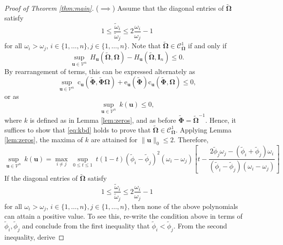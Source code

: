 \documentclass[12pt]{article}
\newcommand{\bl}[1]{{\mathbf #1}}
\newcommand{\bs}[1]{\boldsymbol #1}
\begin{document}
\begin{proof}[Proof of Theorem \ref{thm:main}]
($\implies$) Assume that the diagonal entries of $\tilde{\bs{\Omega}}$ satisfy
\begin{equation*}
    1 \leq \frac{\tilde{\omega}_i}{\tilde{\omega}_j} \leq 2\frac{\omega_i}{\omega_j} - 1
\end{equation*}
for all $\omega_i > \omega_j$, $i \in \{1, \dots, n\}, j \in \{1, \dots, n\}$. Note that $\tilde{\bs{\Omega}} \in \mathcal{C}^1_{\bs{\Omega}}$ if and only if
\begin{equation*}
    \underset{\bl{u} \in \mathcal{V}^n}{\sup}~ H_{\bl{u}}(\tilde{\bs{\Omega}}, \bs{\Omega}) - H_{\bl{u}}(\tilde{\bs{\Omega}}, \bl{I}_n) \leq 0 .
\end{equation*}
By rearrangement of terms, this can be expressed alternately as
\begin{equation*}
    \underset{\bl{u} \in \mathcal{V}^n}{\sup} ~\mathrm{c}_{\bl{u}}(\tilde{\boldsymbol{\Phi}}, \tilde{\boldsymbol{\Phi}} \bs{\Omega}) + \mathrm{e}_{\bl{u}}(\tilde{\boldsymbol{\Phi}}) \mathrm{c}_{\bl{u}}(\tilde{\boldsymbol{\Phi}}, \bs{\Omega}) \leq 0,
\end{equation*}
or as
\begin{equation}\label{eq:kbd}
    \underset{\bl{u} \in \mathcal{V}^n}{\sup} ~ k(\bl{u}) \leq 0,
\end{equation}
where $k$ is defined as in Lemma \ref{lem:zeros}, and as before $\tilde{\bs{\Phi}} = \tilde{\bs{\Omega}}^{-1}$. Hence, it suffices to show that \eqref{eq:kbd} holds to prove that $\tilde{\bs{\Omega}} \in \mathcal{C}^1_{\bs{\Omega}}$. Applying Lemma \ref{lem:zeros}, the maxima of $k$ are attained for $\|\bl{u}\|_0 \leq 2$. Therefore,
\begin{equation}\label{eq:polys}
    \underset{\bl{u} \in \mathcal{V}^n}{\sup} ~ k(\bl{u}) = \underset{i \neq j}{\max}~\underset{0 \leq t \leq 1}{\sup}~t(1-t)(\tilde{\phi}_i - \tilde{\phi}_j)^2 (\omega_i - \omega_j)\left[ t - \frac{2 \tilde{\phi}_j \omega_j - (\tilde{\phi}_i + \tilde{\phi}_j)\omega_i}{(\tilde{\phi}_i - \tilde{\phi}_j)(\omega_i - \omega_j)}\right]
\end{equation}
If the diagonal entries of $\tilde{\bs{\Omega}}$ satisfy
\begin{equation*}
        1 \leq \frac{\tilde{\omega}_i}{\tilde{\omega}_j} \leq 2\frac{\omega_i}{\omega_j} - 1
\end{equation*}
for all $\omega_i > \omega_j$, $i \in \{1, \dots, n\}, j \in \{1, \dots, n\}$, then none of the above polynomials can attain a positive value. To see this, re-write the condition above in terms of $\tilde{\phi}_i, \tilde{\phi}_j$ and conclude from the first inequality that $\tilde{\phi}_i < \tilde{\phi}_j$. From the second inequality, derive

\end{proof}
\end{document}
